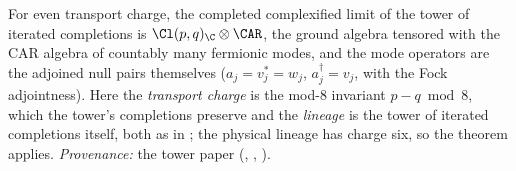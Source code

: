 For even transport charge, the completed complexified limit of the tower of iterated completions is $\Cl(p,q)_\C \otimes \CAR$, the ground algebra tensored with the CAR algebra of countably many fermionic modes, and the mode operators are the adjoined null pairs themselves ($a_j = v_j^* = w_j$, $a_j^\dagger = v_j$, with the Fock adjointness). Here the \emph{transport charge} is the mod-8 invariant $p - q \bmod 8$, which the tower's completions preserve and the \emph{lineage} is the tower of iterated completions itself, both as in \cite{ButlerT3}; the physical lineage has charge six, so the theorem applies. \emph{Provenance:} the tower paper \cite[Prop.~4.1, Thms.~5.3 and 5.6]{ButlerT3} (, , ).

